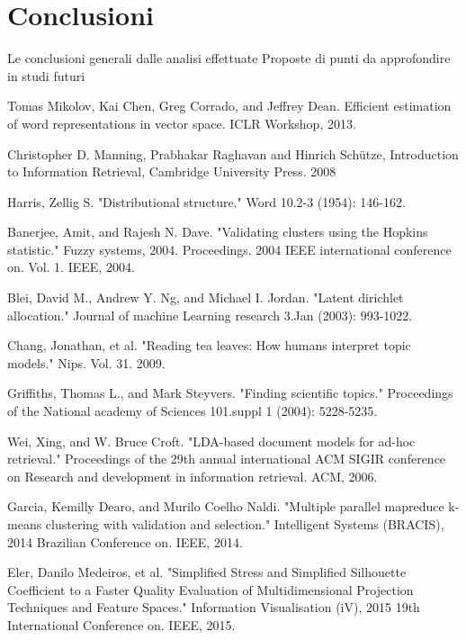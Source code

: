 \documentclass[
	11pt, %
	a4paper, %
	oneside, %
	headinclude,footinclude, %
	BCOR5mm, %
]{scrartcl}
\begin{document}
\section{Conclusioni}
	Le conclusioni generali dalle analisi effettuate
	Proposte di punti da approfondire in studi futuri


\begin{thebibliography}{12}

    Tomas Mikolov, Kai Chen, Greg Corrado, and Jeffrey Dean. Efficient estimation of word representations
    in vector space. ICLR Workshop, 2013.

	Christopher D. Manning, Prabhakar Raghavan and Hinrich Schütze, Introduction to Information Retrieval, Cambridge University Press. 2008

	Harris, Zellig S. "Distributional structure." Word 10.2-3 (1954): 146-162.

	Banerjee, Amit, and Rajesh N. Dave. "Validating clusters using the Hopkins statistic." Fuzzy systems, 2004. Proceedings. 2004 IEEE international conference on. Vol. 1. IEEE, 2004.

	Blei, David M., Andrew Y. Ng, and Michael I. Jordan. "Latent dirichlet allocation." Journal of machine Learning research 3.Jan (2003): 993-1022.

	Chang, Jonathan, et al. "Reading tea leaves: How humans interpret topic models." Nips. Vol. 31. 2009.

	Griffiths, Thomas L., and Mark Steyvers. "Finding scientific topics." Proceedings of the National academy of Sciences 101.suppl 1 (2004): 5228-5235.

Wei, Xing, and W. Bruce Croft. "LDA-based document models for ad-hoc retrieval." Proceedings of the 29th annual international ACM SIGIR conference on Research and development in information retrieval. ACM, 2006.

	Garcia, Kemilly Dearo, and Murilo Coelho Naldi. "Multiple parallel mapreduce k-means clustering with validation and selection." Intelligent Systems (BRACIS), 2014 Brazilian Conference on. IEEE, 2014.

	Eler, Danilo Medeiros, et al. "Simplified Stress and Simplified Silhouette Coefficient to a Faster Quality Evaluation of Multidimensional Projection Techniques and Feature Spaces." Information Visualisation (iV), 2015 19th International Conference on. IEEE, 2015.

\end{thebibliography}

\end{document}
